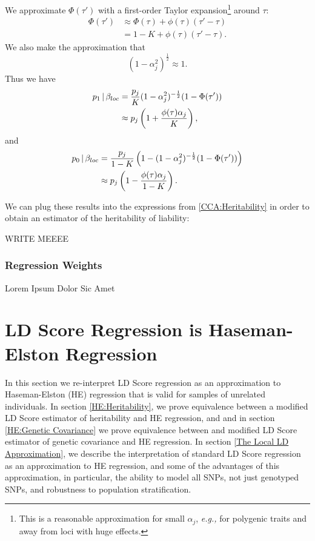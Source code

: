 \documentclass[11pt]{article}
\numberwithin{equation}{section}
\numberwithin{definition}{section}
\numberwithin{thm}{section}
\numberwithin{lemma}{section}
\numberwithin{prop}{section}
\numberwithin{cor}{section}
\numberwithin{hyp}{section}
\begin{document}
We approximate $\Phi(\tau')$ with a first-order Taylor expansion\footnote{
This is a reasonable approximation for small $\alpha_j$, \emph{e.g.,} for polygenic traits
and away from loci with huge effects.}
around $\tau$:
\begin{align*}
	\Phi(\tau') 
&\approx 
	\Phi(\tau) + \phi(\tau)(\tau'-\tau)\\
&=
	1-K + \phi(\tau)(\tau'-\tau).
\end{align*}
We also make the approximation that
$$(1-\alpha_j^2)^{\frac{1}{2}}\approx 1.$$
Thus we have
\begin{align}
\label{taylor1}
\notag
	p_1\,|\,\beta_{loc} 
&= 
	\dfrac{p_j}{K}(1-\alpha_j^2)^{-\frac{1}{2}}(1 - \Phi(\tau'))\\
&\approx
	p_j\left(1+\frac{\phi(\tau)\alpha_j}{K}\right),
\end{align}
and
\begin{align}
\label{taylor2}
\notag
	p_0\,|\,\beta_{loc} 
&=  
	\frac{p_j}{1-K}\left(
		1 - (1-\alpha_j^2)^{-\frac{1}{2}}(1 - \Phi(\tau'))
	\right)\\
&\approx
	p_j\left(1 - \frac{\phi(\tau)\alpha_j}{1-K}\right).
\end{align}

We can plug these results into the expressions from \ref{CCA:Heritability} in order to obtain an estimator of the heritability
of liability:
 
 WRITE MEEEE

\subsubsection{Regression Weights}\label{CCA:Regression Weights}

Lorem Ipsum Dolor Sic Amet

\section{LD Score Regression is Haseman-Elston Regression}\label{LD Score Regression is Haseman-Elston Regression}

In this section we re-interpret LD Score regression as an approximation to Haseman-Elston (HE) regression \cite{haseman1972}
that is valid for samples of unrelated individuals. 
In section \ref{HE:Heritability}, we prove equivalence between a modified LD Score estimator of heritability and HE regression,
and and in section \ref{HE:Genetic Covariance} we prove equivalence between and modified LD Score estimator of 
genetic covariance and HE regression.
In section \ref{The Local LD Approximation}, we describe the interpretation of standard LD Score regression as an approximation
to HE regression, and some of the advantages of this approximation, in particular, the ability to model all SNPs, not just 
genotyped SNPs, and robustness to population stratification.
\end{document}
